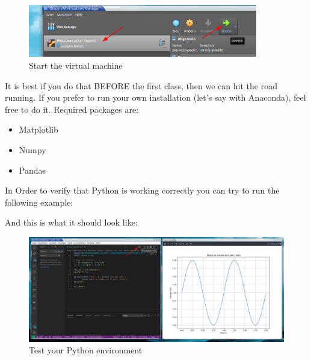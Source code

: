 \begin{figure}[h!]
    \centering
    \includegraphics[width=10cm]{Figures/virtual_box2.png}
    \caption{Start the virtual machine}
\end{figure}

\vspace{1cm}

It is best if you do that BEFORE the first class, then we can hit the road running. If you prefer to run your own installation (let's say with Anaconda),
feel free to do it. Required packages are:

\begin{itemize}
    \item Matplotlib
    \item Numpy
    \item Pandas
\end{itemize}

In Order to verify that Python is working correctly you can try to run the following example:

\vspace{1cm}
\begin{tcolorbox}[enhanced jigsaw,breakable,pad at break*=1mm,
    colback=blue!5!white,colframe=babyblueeyes,title=Test Python environment,
    watermark color=white]
    
\end{tcolorbox}

\newpage

And this is what it should look like:

\vspace{1cm}

\begin{figure}[h!]
    \centering
    \includegraphics[width=18cm]{Figures/vs_code1.png}
    \caption{Test your Python environment}
\end{figure}

%    
